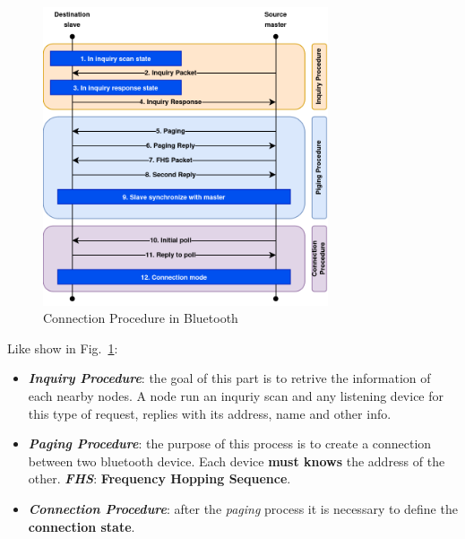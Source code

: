 \begin{figure}[h]
    \centering 
    \includegraphics[width=0.75\textwidth]{img/ble_con}
    \caption{Connection Procedure in Bluetooth}
    \label{fig:ble_con}
\end{figure}

Like show in Fig.~\ref{fig:ble_con}:
\begin{itemize}[nosep]
    \item \textbf{\textit{Inquiry Procedure}}: the goal of this part is to retrive the information of each nearby nodes. A node run an inquriy scan and any listening device for this type of request, replies with its address, name and other info.
    \item \textbf{\textit{Paging Procedure}}: the purpose of this process is to create a connection between two bluetooth device. Each device \textbf{must knows} the address of the other. \textbf{\textit{FHS}}: \textbf{Frequency Hopping Sequence}.
    \item \textbf{\textit{Connection Procedure}}: after the \textit{paging} process it is necessary to define the \textbf{connection state}.
\end{itemize}

